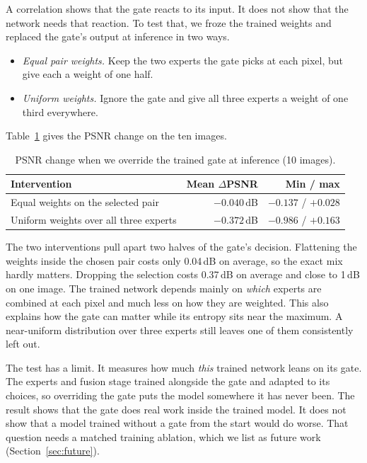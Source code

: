 \documentclass[12pt,a4paper,oneside]{NITR}
\newcommand{\dB}{\,dB}
\begin{document}
A correlation shows that the gate reacts to its input. It does not show that
the network needs that reaction. To test that, we froze the trained weights
and replaced the gate's output at inference in two ways.
\begin{itemize}
	\item \emph{Equal pair weights.} Keep the two experts the gate picks at
	each pixel, but give each a weight of one half.
	\item \emph{Uniform weights.} Ignore the gate and give all three experts a
	weight of one third everywhere.
\end{itemize}
Table~\ref{tab:interventions} gives the PSNR change on the ten images.

\begin{table}[htbp]
	\centering
	\caption{PSNR change when we override the trained gate at inference (10 images).}
	\label{tab:interventions}
	\begin{tabular}{@{}lrr@{}}
		\toprule
		Intervention & Mean $\Delta$PSNR & Min / max \\
		\midrule
		Equal weights on the selected pair    & $-0.040$\dB & $-0.137$ / $+0.028$ \\
		Uniform weights over all three experts & $-0.372$\dB & $-0.986$ / $+0.163$ \\
		\bottomrule
	\end{tabular}
\end{table}

The two interventions pull apart two halves of the gate's decision.
Flattening the weights inside the chosen pair costs only 0.04\dB{} on
average, so the exact mix hardly matters. Dropping the selection costs
0.37\dB{} on average and close to 1\dB{} on one image. The trained network
depends mainly on \emph{which} experts are combined at each pixel and much
less on how they are weighted. This also explains how the gate can matter
while its entropy sits near the maximum. A near-uniform distribution over
three experts still leaves one of them consistently left out.

The test has a limit. It measures how much \emph{this} trained network leans
on its gate. The experts and fusion stage trained alongside the gate and
adapted to its choices, so overriding the gate puts the model somewhere it
has never been. The result shows that the gate does real work inside the
trained model. It does not show that a model trained without a gate from the
start would do worse. That question needs a matched training ablation, which
we list as future work (Section~\ref{sec:future}).
\end{document}
